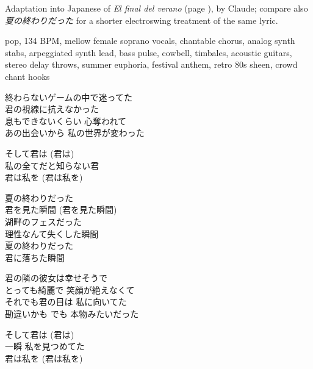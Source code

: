 
\begin{notes}
Adaptation into Japanese of \emph{El final del verano} (page \pageref{sec:verano}), by Claude; compare also \emph{\japanesefont 夏の終わりだった} for a shorter electroswing treatment of the same lyric.
\end{notes}
\begin{style}
pop, 134 BPM, mellow female soprano vocals, chantable chorus, analog synth stabs, arpeggiated synth lead, bass pulse, cowbell, timbales, acoustic guitars, stereo delay throws, summer euphoria, festival anthem, retro 80s sheen, crowd chant hooks
\end{style}
\begin{lyrics}
\begin{japanese}
終わらないゲームの中で迷ってた\\
君の視線に抗えなかった\\
息もできないくらい 心奪われて\\
あの出会いから 私の世界が変わった
\end{japanese}
\begin{japanese}
そして君は (君は)\\
私の全てだと知らない君\\
君は私を (君は私を)
\end{japanese}
\begin{japanese}
夏の終わりだった\\
君を見た瞬間 (君を見た瞬間)\\
湖畔のフェスだった\\
理性なんて失くした瞬間\\
夏の終わりだった\\
君に落ちた瞬間
\end{japanese}
\begin{japanese}
君の隣の彼女は幸せそうで\\
とっても綺麗で 笑顔が絶えなくて\\
それでも君の目は 私に向いてた\\
勘違いかも でも 本物みたいだった
\end{japanese}
\begin{japanese}
そして君は (君は)\\
一瞬 私を見つめてた\\
君は私を (君は私を)
\end{japanese}

\end{lyrics}
